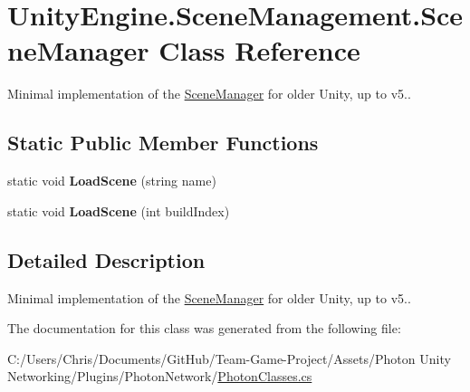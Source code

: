 \hypertarget{class_unity_engine_1_1_scene_management_1_1_scene_manager}{}\section{Unity\+Engine.\+Scene\+Management.\+Scene\+Manager Class Reference}
\label{class_unity_engine_1_1_scene_management_1_1_scene_manager}


Minimal implementation of the \hyperlink{class_unity_engine_1_1_scene_management_1_1_scene_manager}{Scene\+Manager} for older Unity, up to v5.. 


\subsection*{Static Public Member Functions}
\begin{DoxyCompactItemize}
\item 
static void {\bfseries Load\+Scene} (string name)\hypertarget{class_unity_engine_1_1_scene_management_1_1_scene_manager_a44f218a648b456714c451e119db53b2b}{}\label{class_unity_engine_1_1_scene_management_1_1_scene_manager_a44f218a648b456714c451e119db53b2b}

\item 
static void {\bfseries Load\+Scene} (int build\+Index)\hypertarget{class_unity_engine_1_1_scene_management_1_1_scene_manager_a87166a3e05d57edf58bc6e71d0cf75d5}{}\label{class_unity_engine_1_1_scene_management_1_1_scene_manager_a87166a3e05d57edf58bc6e71d0cf75d5}

\end{DoxyCompactItemize}


\subsection{Detailed Description}
Minimal implementation of the \hyperlink{class_unity_engine_1_1_scene_management_1_1_scene_manager}{Scene\+Manager} for older Unity, up to v5..



The documentation for this class was generated from the following file\+:\begin{DoxyCompactItemize}
\item 
C\+:/\+Users/\+Chris/\+Documents/\+Git\+Hub/\+Team-\/\+Game-\/\+Project/\+Assets/\+Photon Unity Networking/\+Plugins/\+Photon\+Network/\hyperlink{_photon_classes_8cs}{Photon\+Classes.\+cs}\end{DoxyCompactItemize}
